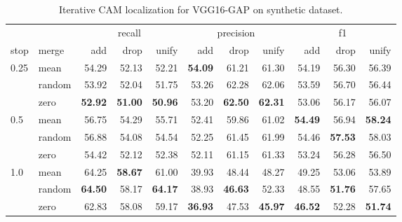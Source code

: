 \begin{table}[ht]
\centering
\begin{tabular}{llrrrrrrrrr}
\toprule
     &       & \multicolumn{3}{c}{recall} & \multicolumn{3}{c}{precision} & \multicolumn{3}{c}{f1} \\
stop & merge & add & drop & unify & add & drop & unify & add & drop & unify \\
\cmidrule(rl){1-2} \cmidrule(rl){3-5} \cmidrule(rl){6-8} \cmidrule(rl){9-11}
\multirow[t]{3}{*}{0.25} & mean & 54.29 & 52.13 & 52.21 & \color{teal} \bfseries 54.09 & 61.21 & 61.30 & 54.19 & 56.30 & 56.39 \\
 & random & 53.92 & 52.04 & 51.75 & 53.26 & 62.28 & 62.06 & 53.59 & 56.70 & 56.44 \\
 & zero & \color{purple} \bfseries 52.92 & \color{purple} \bfseries 51.00 & \color{purple} \bfseries 50.96 & 53.20 & \color{teal} \bfseries 62.50 & \color{teal} \bfseries 62.31 & 53.06 & 56.17 & 56.07 \\
\multirow[t]{3}{*}{0.5} & mean & 56.75 & 54.29 & 55.71 & 52.41 & 59.86 & 61.02 & \color{teal} \bfseries 54.49 & 56.94 & \color{teal} \bfseries 58.24 \\
 & random & 56.88 & 54.08 & 54.54 & 52.25 & 61.45 & 61.99 & 54.46 & \color{teal} \bfseries 57.53 & 58.03 \\
 & zero & 54.42 & 52.12 & 52.38 & 52.11 & 61.15 & 61.33 & 53.24 & 56.28 & 56.50 \\
\multirow[t]{3}{*}{1.0} & mean & 64.25 & \color{teal} \bfseries 58.67 & 61.00 & 39.93 & 48.44 & 48.27 & 49.25 & 53.06 & 53.89 \\
 & random & \color{teal} \bfseries 64.50 & 58.17 & \color{teal} \bfseries 64.17 & 38.93 & \color{purple} \bfseries 46.63 & 52.33 & 48.55 & \color{purple} \bfseries 51.76 & 57.65 \\
 & zero & 62.83 & 58.08 & 59.17 & \color{purple} \bfseries 36.93 & 47.53 & \color{purple} \bfseries 45.97 & \color{purple} \bfseries 46.52 & 52.28 & \color{purple} \bfseries 51.74 \\
\bottomrule
\end{tabular}
\caption[Iterative CAM localization for VGG16-GAP on synthetic dataset]{Iterative CAM localization for VGG16-GAP on synthetic dataset.}
\label{tab:iter_metrics_vgg16_cam_synthetic}
\end{table}


